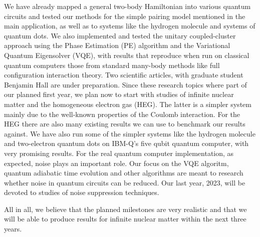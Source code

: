 \documentclass[11pt]{article}
\begin{document}
We have already mapped a general two-body Hamiltonian into various quantum circuits and tested our methods for the simple pairing model mentioned in the main application, as well as to systems like the hydrogen molecule and systems of quantum dots. We also implemented and tested the unitary coupled-cluster approach using the Phase Estimation (PE) algorithm and the Variational Quantum Eigensolver (VQE), with results that reproduce when run on classical quantum computers those from standard many-body methods like full configuration interaction theory. Two scientific articles, with graduate student Benjamin Hall are under preparation. Since these research topics  where part of our planned first year, we plan now to start with studies of infinite nuclear matter and the homogeneous electron gas (HEG). The latter is a simpler system mainly due to the well-known properties of the Coulomb interaction. For the HEG there are also many existing results we can use to benchmark our results against. 
We have also run some of the simpler systems like the hydrogen molecule and two-electron quantum dots on IBM-Q's five qubit quantum computer, with very promising results. For the real quantum computer implementation, as expected, noise plays an important role. Our focus on the VQE algoritm, quantum adiabatic time evolution and other algorithms are meant to research whether noise in quantum circuits can be reduced.  Our last year, 2023, will be devoted to studies of noise suppression techniques. 

All in all, we believe that the planned milestones are very realistic and that we will be able to produce results for infinite nuclear matter within the next three years.
\end{document}
